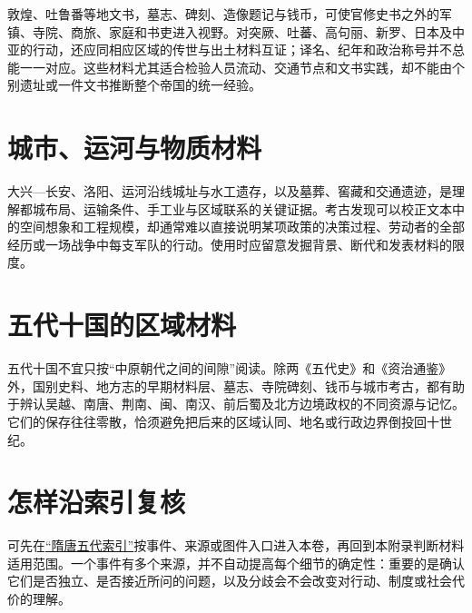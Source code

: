 敦煌、吐鲁番等地文书，墓志、碑刻、造像题记与钱币，可使官修史书之外的军镇、寺院、商旅、家庭和书吏进入视野。对突厥、吐蕃、高句丽、新罗、日本及中亚的行动，还应同相应区域的传世与出土材料互证；译名、纪年和政治称号并不总能一一对应。这些材料尤其适合检验人员流动、交通节点和文书实践，却不能由个别遗址或一件文书推断整个帝国的统一经验。

\section{城市、运河与物质材料}
\label{appsrc:material}

大兴—长安、洛阳、运河沿线城址与水工遗存，以及墓葬、窖藏和交通遗迹，是理解都城布局、运输条件、手工业与区域联系的关键证据。考古发现可以校正文本中的空间想象和工程规模，却通常难以直接说明某项政策的决策过程、劳动者的全部经历或一场战争中每支军队的行动。使用时应留意发掘背景、断代和发表材料的限度。

\section{五代十国的区域材料}
\label{appsrc:five-dynasties}

五代十国不宜只按“中原朝代之间的间隙”阅读。除两《五代史》和《资治通鉴》外，国别史料、地方志的早期材料层、墓志、寺院碑刻、钱币与城市考古，都有助于辨认吴越、南唐、荆南、闽、南汉、前后蜀及北方边境政权的不同资源与记忆。它们的保存往往零散，恰须避免把后来的区域认同、地名或行政边界倒投回十世纪。

\section{怎样沿索引复核}

可先在\hyperref[app:index]{“隋唐五代索引”}按事件、来源或图件入口进入本卷，再回到本附录判断材料适用范围。一个事件有多个来源，并不自动提高每个细节的确定性：重要的是确认它们是否独立、是否接近所问的问题，以及分歧会不会改变对行动、制度或社会代价的理解。
